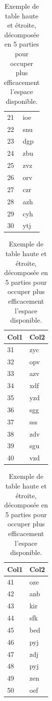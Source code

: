 \documentclass{ceri}
\begin{document}
\begin{table}[htb]
\begin{minipage}[t]{0.19\linewidth}
\begin{tabular}{l l}
			21 & ioe \\
			22 & snu \\
			23 & dgp \\
			24 & zbu \\
			25 & zvz \\
			26 & orv \\
			27 & czr \\
			28 & azh \\
			29 & cyh \\
			30 & ytj \\
			\hline
		\end{tabular}
	\end{minipage}
	\begin{minipage}[t]{0.19\linewidth}
		\centering
		\begin{tabular}{l l}
			\hline
			\rowcolor{DarkColor} 
			\textbf{Col1} 			& \textbf{Col2} \\ 
			\hline
			31 & zyc \\
			32 & opv \\
			33 & azv \\
			34 & xdf \\
			35 & yzd \\
			36 & sgg \\
			37 & sss \\
			38 & zdv \\
			39 & sgu \\
			40 & vzd \\
			\hline
		\end{tabular}
	\end{minipage}
	\begin{minipage}[t]{0.19\linewidth}
		\centering
		\begin{tabular}{l l}
			\hline
			\rowcolor{DarkColor} 
			\textbf{Col1} 			& \textbf{Col2} \\ 
			\hline
			41 & oze \\
			42 & anb \\
			43 & kir \\
			44 & sfk \\
			45 & bed \\
			46 & pyj \\
			47 & zdj \\
			48 & pyj \\
			49 & zen \\
			50 & oef \\
			\hline
		\end{tabular}
	\end{minipage}
	\caption{Exemple de table haute et étroite, décomposée en 5 parties pour occuper plus efficacement l'espace disponible.}
	\label{tab:etroit}
\end{table}
\end{document}
